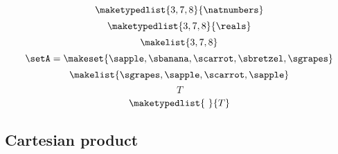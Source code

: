 \begin{forslides}
\begin{equation}\label{slides_session2_41}
\maketypedlist{3, 7, 8}{\natnumbers}
\end{equation}
\begin{equation}\label{slides_session2_42}
\maketypedlist{3, 7, 8}{\reals}
\end{equation}
 \begin{equation}\label{slides_session2_43}
\makelist{3, 7, 8}
\end{equation}
\begin{equation}\label{slides_session2_44}
\setA = \makeset{\sapple, \sbanana, \scarrot, \sbretzel, \sgrapes}
\end{equation}
 \begin{equation}\label{slides_session2_45}
\makelist{\sgrapes, \sapple, \scarrot, \sapple}
\end{equation}
\begin{equation}\label{slides_session2_46}
T
\end{equation}
 \begin{equation}\label{slides_session2_47}
\maketypedlist{\ }{T}
\end{equation}

\subsection{Cartesian product}


\end{forslides}
